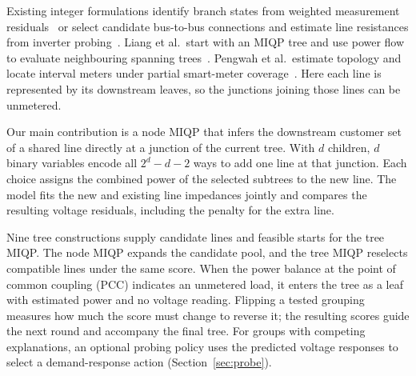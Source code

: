 \documentclass[journal,onecolumn,11pt]{IEEEtran}
\begin{document}
Existing integer formulations identify branch states from weighted measurement residuals~\cite{tian} or select
candidate bus-to-bus connections and estimate line resistances from inverter probing~\cite{taheri}.
Liang et al.\ start with an MIQP tree and use power flow to evaluate neighbouring spanning trees~\cite{liang}.
Pengwah et al.\ estimate topology and locate interval meters under partial smart-meter coverage~\cite{pengwah}.
Here each line is represented by its downstream leaves, so the junctions joining those lines can be unmetered.

Our main contribution is a node MIQP that infers the downstream customer set of a shared line directly at a
junction of the current tree. With $d$ children, $d$ binary variables encode all $2^d-d-2$ ways to add one
line at that junction. Each choice assigns the combined power of the selected subtrees to the new line.
The model fits the new and existing line impedances jointly and compares the resulting voltage residuals,
including the penalty for the extra line.

Nine tree constructions supply candidate lines and feasible starts for the tree MIQP. The node MIQP expands
the candidate pool, and the tree MIQP reselects compatible lines under the same score. When the power balance
at the point of common coupling (PCC)
indicates an unmetered load, it enters the tree as a leaf with estimated power and no voltage reading.
Flipping a tested grouping measures how much the score must change to reverse it; the resulting scores guide
the next round and accompany the final tree. For groups with competing explanations, an optional probing
policy uses the predicted voltage responses to select a demand-response action (Section~\ref{sec:probe}).
\end{document}

